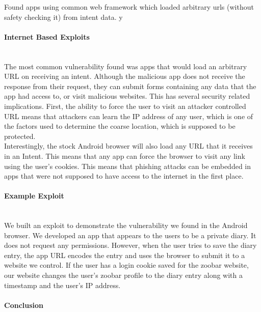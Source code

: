 \documentclass[12pt,a4paper]{article} \usepackage{verbatim}
\begin{document}
Found apps using common web framework which loaded arbitrary urls (without
safety checking it) from intent data.  y

\paragraph{Internet Based Exploits} ~\\ The most common vulnerability found was
apps that would load an arbitrary URL on receiving an intent. Although the
malicious app does not receive the response from their request, they can submit
forms containing any data that the app had access to, or visit malicious
websites. This has several security related implications. First, the ability to
force the user to visit an attacker controlled URL means that attackers can
learn the IP address of any user, which is one of the factors used to determine
the coarse location, which is supposed to be protected.  \\ Interestingly, the
stock Android browser will also load any URL that it receives in an Intent. This
means that any app can force the browser to visit any link using the user's
cookies. This means that phishing attacks can be embedded in apps that were not
supposed to have access to the internet in the first place. 

\paragraph{Example Exploit} ~\\
We built an exploit to demonstrate the vulnerability we found in the Android browser. We developed an app that appears to the users to be a private diary. It does not request any permissions. However, when the user tries to save the diary entry, the app URL encodes the entry and uses the browser to submit it to a website we control. If the user has a login cookie saved for the zoobar website, our website changes the user's zoobar profile to the diary entry along with a timestamp and the user's IP address. 

\paragraph{Conclusion} ~\\

 
\end{document}
